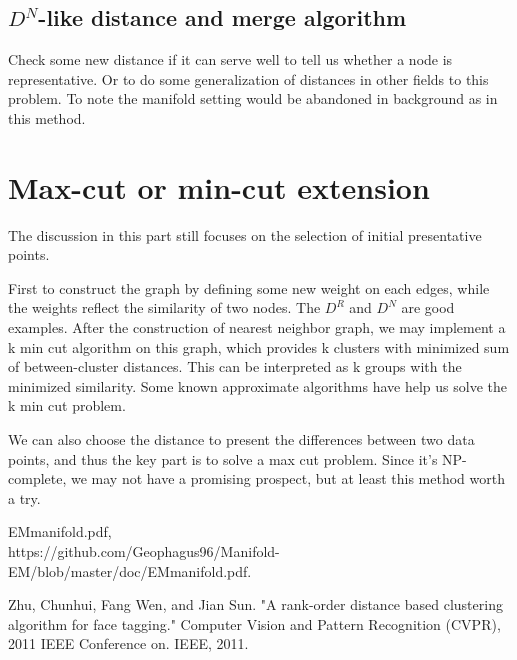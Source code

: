 \documentclass[letterpaper]{article}
\begin{document}
\subsection{$D^N$-like distance and merge algorithm}
Check some new distance if it can serve well to tell us whether a node is representative. Or to do some generalization of distances in other fields to this problem. To note the manifold setting would be abandoned in background as in this method.

\section{Max-cut or min-cut extension}
The discussion in this part still focuses on the selection of initial presentative points. \par
First to construct the graph by defining some new weight on each edges, while the weights reflect the similarity of two nodes. The $D^R$ and $D^N$ are good examples. After the construction of nearest neighbor graph, we may implement a k min cut algorithm on this graph, which provides k clusters with minimized sum of between-cluster distances. This can be interpreted as k groups with the minimized similarity. Some known approximate algorithms have help us solve the k min cut problem.\par
We can also choose the distance to present the differences between two data points, and thus the key part is to solve a max cut problem. Since it's NP-complete, we may not have a promising prospect, but at least this method worth a try.

\begin{thebibliography}{}
	EMmanifold.pdf, \\ https://github.com/Geophagus96/Manifold-EM/blob/master/doc/EMmanifold.pdf.
	
	Zhu, Chunhui, Fang Wen, and Jian Sun. 
	"A rank-order distance based clustering algorithm for face tagging." Computer Vision and Pattern Recognition (CVPR), 2011 IEEE Conference on. IEEE, 2011.
\end{thebibliography}
\end{document}
